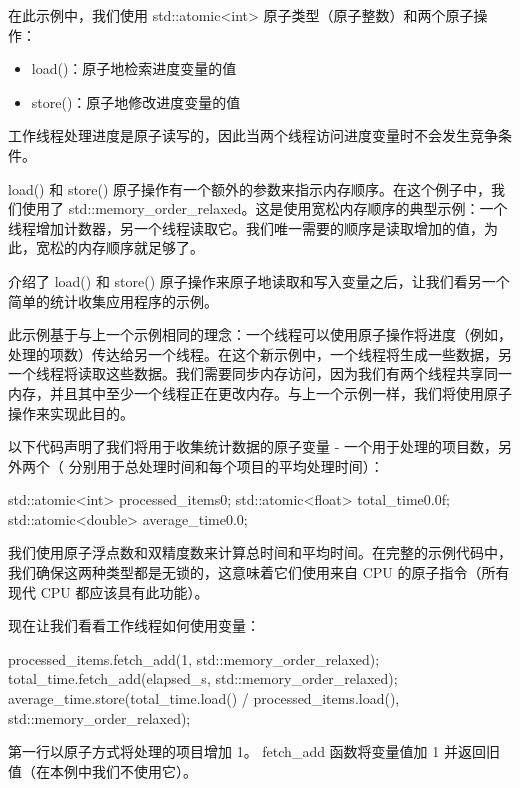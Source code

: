 在此示例中，我们使用 std::atomic<int> 原子类型（原子整数）和两个原子操作：

\begin{itemize}
\item
load()：原子地检索进度变量的值

\item
store()：原子地修改进度变量的值
\end{itemize}

工作线程处理进度是原子读写的，因此当两个线程访问进度变量时不会发生竞争条件。

load() 和 store() 原子操作有一个额外的参数来指示内存顺序。在这个例子中，我们使用了 std::memory\_order\_relaxed。这是使用宽松内存顺序的典型示例：一个线程增加计数器，另一个线程读取它。我们唯一需要的顺序是读取增加的值，为此，宽松的内存顺序就足够了。

介绍了 load() 和 store() 原子操作来原子地读取和写入变量之后，让我们看另一个简单的统计收集应用程序的示例。


此示例基于与上一个示例相同的理念：一个线程可以使用原子操作将进度（例如，处理的项数）传达给另一个线程。在这个新示例中，一个线程将生成一些数据，另一个线程将读取这些数据。我们需要同步内存访问，因为我们有两个线程共享同一内存，并且其中至少一个线程正在更改内存。与上一个示例一样，我们将使用原子操作来实现此目的。

以下代码声明了我们将用于收集统计数据的原子变量 - 一个用于处理的项目数，另外两个（ 分别用于总处理时间和每个项目的平均处理时间）：

\begin{cpp}
std::atomic<int> processed_items{0};
std::atomic<float> total_time{0.0f};
std::atomic<double> average_time{0.0};
\end{cpp}

我们使用原子浮点数和双精度数来计算总时间和平均时间。在完整的示例代码中，我们确保这两种类型都是无锁的，这意味着它们使用来自 CPU 的原子指令（所有现代 CPU 都应该具有此功能）。

现在让我们看看工作线程如何使用变量：

\begin{cpp}
processed_items.fetch_add(1, std::memory_order_relaxed);
total_time.fetch_add(elapsed_s, std::memory_order_relaxed);
average_time.store(total_time.load() / processed_items.load(),
std::memory_order_relaxed);
\end{cpp}

第一行以原子方式将处理的项目增加 1。 fetch\_add 函数将变量值加 1 并返回旧值（在本例中我们不使用它）。

